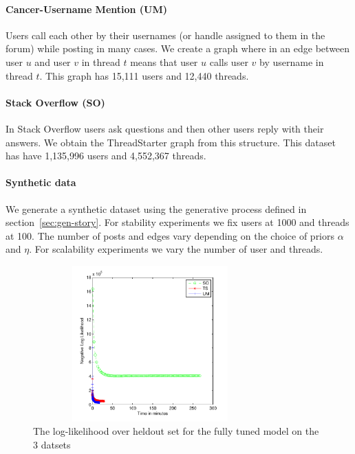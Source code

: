 \documentclass{sig-alternate}
\newcommand{\comment}[1]{\textcolor{red}{[#1]}}
\begin{document}
\paragraph{Cancer-Username Mention (UM)} Users call each other by 
their usernames (or handle assigned to them in the
forum) while posting in many cases. We create a graph where in an edge between
user $u$ and user $v$ in thread $t$ means that user $u$ calls user $v$ by
username in thread $t$. This graph has 15,111 users and
12,440 threads.
\vspace*{-0.5\baselineskip}
\paragraph{Stack Overflow (SO)} In Stack Overflow users ask 
questions and then other users reply with their
answers. We obtain the ThreadStarter graph from this structure. This dataset has
have 1,135,996 users and 4,552,367 threads.
\vspace*{-0.5\baselineskip}
\paragraph{Synthetic data} We generate a synthetic dataset 
using the generative process defined in
section~\ref{sec:gen-story}. For stability experiments 
we fix users at 1000 and threads at 100. The number of 
posts and edges vary depending on the choice of priors $\alpha$ and $\eta$.
For scalability experiments we vary the number of user and threads.  

\begin{figure}
\begin{center}
\includegraphics[height=6cm,width=9cm]{3LLPlots.pdf}
\end{center}
\caption{The log-likelihood over heldout set for the fully tuned model on the
3 datsets}
\label{fig:finalLLheld}
\end{figure}
\end{document}
